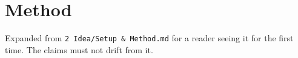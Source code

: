 \section{Method}
\label{sec:method}

Expanded from \texttt{2 Idea/Setup \& Method.md} for a reader seeing it for the first
time. The claims must not drift from it.
